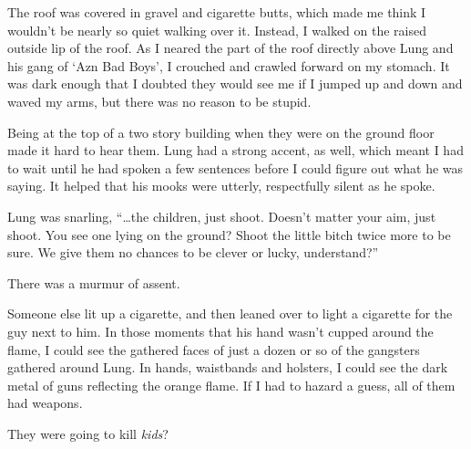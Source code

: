 The roof was covered in gravel and cigarette butts, which made me think I wouldn't be nearly so quiet walking over it.  Instead, I walked on the raised outside lip of the roof.  As I neared the part of the roof directly above Lung and his gang of `Azn Bad Boys', I crouched and crawled forward on my stomach.  It was dark enough that I doubted they would see me if I jumped up and down and waved my arms, but there was no reason to be stupid.



Being at the top of a two story building when they were on the ground floor made it hard to hear them.  Lung had a strong accent, as well, which meant I had to wait until he had spoken a few sentences before I could figure out what he was saying.  It helped that his mooks were utterly, respectfully silent as he spoke.



Lung was snarling, ``\ldots{}the children, just shoot.  Doesn't matter your aim, just shoot.  You see one lying on the ground?  Shoot the little bitch twice more to be sure.  We give them no chances to be clever or lucky, understand?''



There was a murmur of assent.



Someone else lit up a cigarette, and then leaned over to light a cigarette for the guy next to him.  In those moments that his hand wasn't cupped around the flame, I could see the gathered faces of just a dozen or so of the gangsters gathered around Lung.  In hands, waistbands and holsters, I could see the dark metal of guns reflecting the orange flame.  If I had to hazard a guess, all of them had weapons.



They were going to kill \emph{kids}?






